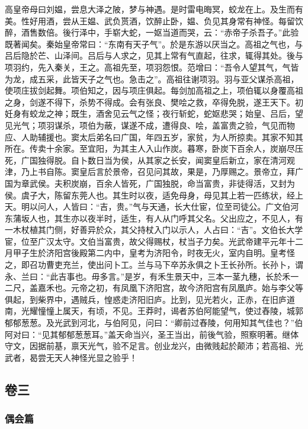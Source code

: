 \documentclass[]{article}
\begin{document}
高皇帝母曰刘媪，尝息大泽之陂，梦与神遇。是时雷电晦冥，蛟龙在上。及生而有美。性好用酒，尝从王媪、武负贳酒，饮醉止卧，媪、负见其身常有神怪。每留饮醉，酒售数倍。後行泽中，手崭大蛇，一妪当道而哭，云：``赤帝子杀吾子。''此验既著闻矣。秦始皇帝常曰：``东南有天子气''。於是东游以厌当之。高祖之气也，与吕后隐於芒、山泽间。吕后与人求之，见其上常有气直起，往求，辄得其处。後与项羽约，先入秦关，王之。高祖先至，项羽怨恨。范增曰：``吾令人望其气，气皆为龙，成五采，此皆天子之气也。急击之''。高祖往谢项羽。羽与亚父谋杀高祖，使项庄拔剑起舞。项伯知之，因与项庄俱起。每剑加高祖之上，项伯辄以身覆高祖之身，剑遂不得下，杀势不得成。会有张良、樊哙之救，卒得免脱，遂王天下。初妊身有蛟龙之神；既生，酒舍见云气之怪；夜行斩蛇，蛇妪悲哭；始皇、吕后，望见光气；项羽谋杀，项伯为蔽，谋遂不成，遭得良、哙，盖富贵之验，气见而物应、人助辅援也。窦太后弟名曰广国，年四五岁，家贫，为人所掠卖。其家不知其所在。传卖十余家。至宜阳，为其主人入山作炭。暮寒，卧炭下百余人，炭崩尽压死，广国独得脱。自卜数日当为侯，从其家之长安，闻窦皇后新立，家在清河观津，乃上书自陈。窦皇后言於景帝，召见问其故，果是，乃厚赐之。景帝立，拜广国为章武侯。夫积炭崩，百余人皆死，广国独脱，命当富贵，非徒得活，又封为侯。虞子大，陈留东莞人也。其生时以夜，适免母身，母见其上若一匹练状，经上天。明以问人，人皆曰：``吉，贵。''气与天通，长大仕宦，位至司徒公。广文伯河东蒲坂人也，其生亦以夜半时，适生，有人从门呼其父名。父出应之，不见人，有一木杖植其门侧，好善异於众，其父持杖入门以示人，人占曰：``吉''。文伯长大学宦，位至广汉太守。文伯当富贵，故父得赐杖，杖当子力矣。光武帝建平元年十二月甲子生於济阳宫後殿第二内中，皇考为济阳令，时夜无火，室内自明。皇考怪之，即召功曹吏充兰，使出问卜工。兰与马下卒苏永俱之卜王长孙所。长孙卜，谓永、兰曰：``此吉事也。毋多言。''是岁，有禾生景天中，三本一茎九穗，长於禾一二尺，盖嘉禾也。元帝之初，有凤凰下济阳宫，故今济阳宫有凤凰庐。始与李父等俱起，到柴界中，遇贼兵，惶惑走济阳旧庐。比到，见光若火，正赤，在旧庐道南，光耀憧憧上属天，有顷，不见。王莽时，谒者苏伯阿能望气，使过舂陵，城郭郁郁葱葱。及光武到河北，与伯阿见，问曰：``卿前过舂陵，何用知其气佳也？''伯阿对曰：``见其郁郁葱葱耳。''盖天命当兴，圣王当出，前後气验，照察明著。继体守文，因据前基，禀天光气，验不足言。创业龙兴，由微贱起於颠沛；若高祖、光武者，曷尝无天人神怪光显之验乎！

\hypertarget{header-n99}{%
\subsection{卷三}\label{header-n99}}

\hypertarget{header-n100}{%
\subsubsection{偶会篇}\label{header-n100}}
\end{document}
